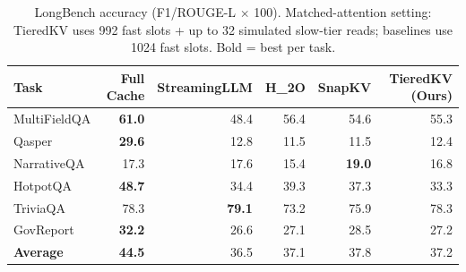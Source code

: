 \begin{table}[t]
\centering
\small
\setlength{\tabcolsep}{5pt}
\caption{LongBench accuracy (F1/ROUGE-L $\times$ 100). Matched-attention setting: TieredKV uses 992 fast slots + up to 32 simulated slow-tier reads; baselines use 1024 fast slots. Bold = best per task.}
\label{tab:accuracy_fair}
\begin{tabular}{lrrrrr}
\toprule
\textbf{Task} & \textbf{Full Cache} & \textbf{StreamingLLM} & \textbf{H_2O} & \textbf{SnapKV} & \textbf{TieredKV (Ours)} \\
\midrule
MultiFieldQA & \textbf{61.0} & 48.4 & 56.4 & 54.6 & 55.3 \\
Qasper & \textbf{29.6} & 12.8 & 11.5 & 11.5 & 12.4 \\
NarrativeQA & 17.3 & 17.6 & 15.4 & \textbf{19.0} & 16.8 \\
HotpotQA & \textbf{48.7} & 34.4 & 39.3 & 37.3 & 33.3 \\
TriviaQA & 78.3 & \textbf{79.1} & 73.2 & 75.9 & 78.3 \\
GovReport & \textbf{32.2} & 26.6 & 27.1 & 28.5 & 27.2 \\
\midrule
\textbf{Average} & \textbf{44.5} & 36.5 & 37.1 & 37.8 & 37.2 \\
\bottomrule
\end{tabular}
\end{table}

